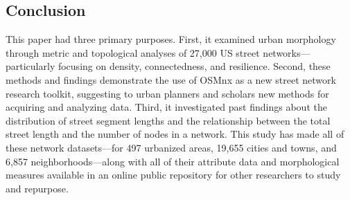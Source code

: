 \documentclass[11pt]{article}
\begin{document}
\begin{multicols}{2}
\section{Conclusion}

This paper had three primary purposes. First, it examined urban morphology through metric and topological analyses of 27,000 US street networks---particularly focusing on density, connectedness, and resilience. Second, these methods and findings demonstrate the use of OSMnx as a new street network research toolkit, suggesting to urban planners and scholars new methods for acquiring and analyzing data. Third, it investigated past findings about the distribution of street segment lengths and the relationship between the total street length and the number of nodes in a network. This study has made all of these network datasets---for 497 urbanized areas, 19,655 cities and towns, and 6,857 neighborhoods---along with all of their attribute data and morphological measures available in an online public repository for other researchers to study and repurpose.




\setlength{\bibsep}{0.00cm plus 0.05cm}



\end{multicols}
\end{document}
